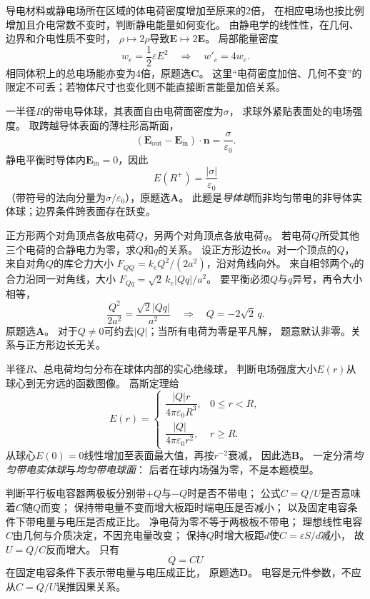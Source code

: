 \problemtext 导电材料或静电场所在区域的体电荷密度增加至原来的2倍，
在相应电场也按比例增加且介电常数不变时，判断静电能量如何变化。
\workings
由静电学的线性性，在几何、边界和介电性质不变时，
$\rho\mapsto2\rho$导致$\bm E\mapsto2\bm E$。
局部能量密度
\[
w_e=\frac12\varepsilon E^2
\quad\Longrightarrow\quad
\boxed{w'_e=4w_e}.
\]
相同体积上的总电场能亦变为4倍，原题选\textbf{C}。
\crosscheck 这里“电荷密度加倍、几何不变”的限定不可丢；若物体尺寸也变化则不能直接断言能量加倍关系。

\problemtext 一半径$R$的带电导体球，其表面自由电荷面密度为$\sigma$，
求球外紧贴表面处的电场强度。
\workings
取跨越导体表面的薄柱形高斯面，
\[
(\bm E_{\mathrm{out}}-\bm E_{\mathrm{in}})\cdot\bm n
=\frac{\sigma}{\varepsilon_0}.
\]
静电平衡时导体内$\bm E_{\mathrm{in}}=0$，因此
\[
\boxed{E(R^+)=\frac{|\sigma|}{\varepsilon_0}}
\]
（带符号的法向分量为$\sigma/\varepsilon_0$），原题选\textbf{A}。
\crosscheck 此题是\emph{导体球}而非均匀带电的非导体实体球；边界条件跨表面存在跃变。

\problemtext 正方形两个对角顶点各放电荷$Q$，另两个对角顶点各放电荷$q$。
若电荷$Q$所受其他三个电荷的合静电力为零，求$Q$和$q$的关系。
\workings
设正方形边长$a$。对一个顶点的$Q$，
来自对角$Q$的库仑力大小
$F_{QQ}=k_eQ^2/(2a^2)$，沿对角线向外。
来自相邻两个$q$的合力沿同一对角线，大小
$F_{Qq}=\sqrt2\,k_e|Qq|/a^2$。
要平衡必须$Q$与$q$异号，再令大小相等，
\[
\frac{Q^2}{2a^2}=\frac{\sqrt2|Qq|}{a^2}
\quad\Longrightarrow\quad
\boxed{Q=-2\sqrt2\,q}.
\]
原题选\textbf{A}。
\crosscheck 对于$Q\ne0$可约去$|Q|$；当所有电荷为零是平凡解，
题意默认非零。关系与正方形边长无关。

\problemtext 半径$R$、总电荷均匀分布在球体内部的实心绝缘球，
判断电场强度大小$E(r)$从球心到无穷远的函数图像。
\workings
高斯定理给
\[
E(r)=
\begin{cases}
\dfrac{|Q|r}{4\pi\varepsilon_0 R^3},&0\le r<R,\\[3pt]
\dfrac{|Q|}{4\pi\varepsilon_0r^2},&r\ge R.
\end{cases}
\]
从球心$E(0)=0$线性增加至表面最大值，再按$r^{-2}$衰减，
因此选\textbf{B}。
\crosscheck 一定分清\emph{均匀带电实体球}与\emph{均匀带电球面}：
后者在球内场强为零，不是本题模型。

\problemtext 判断平行板电容器两极板分别带$+Q$与$-Q$时是否不带电；
公式$C=Q/U$是否意味着$C$随$Q$而变；
保持带电量不变而增大板距时端电压是否减小；
以及固定电容条件下带电量与电压是否成正比。
\workings
净电荷为零不等于两极板不带电；
理想线性电容$C$由几何与介质决定，不因充电量改变；
保持$Q$时增大板距$d$使$C=\varepsilon S/d$减小，
故$U=Q/C$反而增大。
只有
\[
\boxed{Q=CU}
\]
在固定电容条件下表示带电量与电压成正比，
原题选\textbf{D}。
\crosscheck 电容是元件参数，不应从$C=Q/U$误推因果关系。

